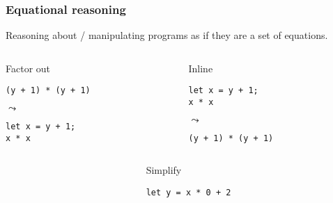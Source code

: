 \documentclass[t]{beamer}
\begin{document}
\begin{frame}[c,fragile]
\begin{center}
\end{center}
\end{frame}


\begin{frame}[fragile]
\frametitle{Equational reasoning}

Reasoning about / manipulating programs as if they are a set of equations.

\begin{columns}

\begin{column}[T]{0.48\textwidth}
\begin{block}{Factor out}
\begin{verbatim}
(y + 1) * (y + 1)
\end{verbatim}

\(\leadsto\)

\begin{verbatim}
let x = y + 1;
x * x
\end{verbatim}
\end{block}
\end{column}

\begin{column}[T]{0.48\textwidth}
\begin{block}{Inline}
\begin{verbatim}
let x = y + 1;
x * x
\end{verbatim}

\(\leadsto\)

\begin{verbatim}
(y + 1) * (y + 1)
\end{verbatim}
\end{block}
\end{column}

\end{columns}

\begin{columns}

\begin{column}[T]{0.24\textwidth}
\end{column}

\begin{column}[T]{0.48\textwidth}
\begin{block}{Simplify}
\begin{verbatim}
let y = x * 0 + 2
\end{verbatim}


\end{block}
\end{column}
\end{columns}
\end{frame}
\end{document}
